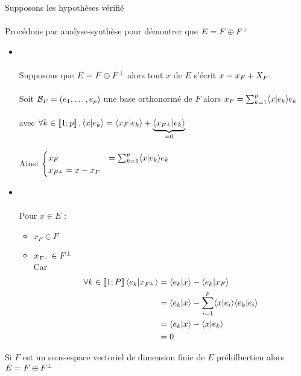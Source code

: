 \begin{dem}
    Supposons les hypothèses vérifié\\~\\
    Procédons par analyse-synthèse pour démontrer que \(E = F \oplus F\ortho\)
    \begin{itemize}
        \item \analyse\\~\\
            Supposons que \(E = F \oplus F\ortho\) alors tout \(x\) de \(E\) s'écrit \(x = x_F + X_{F\ortho}\)\\~\\
            Soit \(\cal{B}_F = (e_1, \dots, e_p)\) une base orthonormé de \(F\) alors \(x_F = \sum_{k=1}^p \scal{x}{e_k}e_k\)\\~\\
            avec \(\forall k \in \interventierii{1}{p}, \scal{x}{e_k} = \scal{x_F}{e_k} + \underbrace{\scal{x_{F\ortho}}{e_k}}_{ = 0}\)\\~\\
            Ainsi \(\begin{cases}
                x_F &= \sum_{k=1}^p \scal{x}{e_k}e_k \\
                x_{F\ortho} = x-x_F
            \end{cases}\)
        \item \synthese \\~\\
            Pour \(x \in E\) : \begin{itemize}
                \item \(x_F \in F\)
                \item \(x_{F\ortho} \in F\ortho\) \\
                Car \begin{align*}
                \forall k \in \interventierii{1}{P} \scal{e_k}{x_{F\ortho}} &= \scal{e_k}{x} - \scal{e_k}{x_F}\\
                &= \scal{e_k}{x} - \sum_{i=1}^p \scal{x}{e_i}\scal{e_k}{e_i}\\
                &=  \scal{e_k}{x} - \scal{x}{e_k}\\
                &= 0
                \end{align*}
            \end{itemize}
    \end{itemize}
    \conclusion Si \(F\) est un sous-espace vectoriel de dimension finie de \(E\) préhilbertien alors \(E = F \oplus F\ortho\)
\end{dem}
